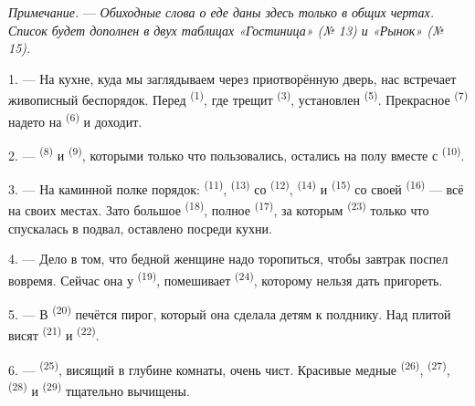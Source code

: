 \textit{Примечание.} --- \textit{Обиходные слова о еде даны здесь только
в общих чертах. Список будет дополнен в двух таблицах «Гостиница»
(№ 13) и «Рынок» (№ 15).}

\VUsaut{4.6mm}
\VUsaut{3.0mm}

1. --- На кухне, куда мы заглядываем через приотворённую дверь, нас
встречает живописный беспорядок. Перед  \textsuperscript{(1)}, где
трещит  \textsuperscript{(3)}, установлен 
\textsuperscript{(5)}. Прекрасное  \textsuperscript{(7)} надето на
 \textsuperscript{(6)} и доходит.

2. ---  \textsuperscript{(8)} и 
\textsuperscript{(9)}, которыми только что пользовались, остались на полу вместе
с  \textsuperscript{(10)}.

3. --- На каминной полке порядок:  \textsuperscript{(11)},
 \textsuperscript{(13)} со  \textsuperscript{(12)},
 \textsuperscript{(14)} и 
\textsuperscript{(15)} со своей  \textsuperscript{(16)} --- всё на своих
местах. Зато большое  \textsuperscript{(18)}, полное
 \textsuperscript{(17)}, за которым  \textsuperscript{(23)}
только что спускалась в подвал, оставлено посреди кухни.

4. --- Дело в том, что бедной женщине надо торопиться, чтобы завтрак
поспел вовремя. Сейчас она у  \textsuperscript{(19)}, помешивает
 \textsuperscript{(24)}, которому нельзя дать пригореть.

5. --- В  \textsuperscript{(20)} печётся пирог, который она
сделала детям к полднику. Над плитой висят 
\textsuperscript{(21)} и  \textsuperscript{(22)}.

\VUsaut{4.0mm}
\VUsaut{3.0mm}

6. ---  \textsuperscript{(25)}, висящий в глубине комнаты,
очень чист. Красивые медные  \textsuperscript{(26)},
 \textsuperscript{(27)},  \textsuperscript{(28)} и
 \textsuperscript{(29)} тщательно вычищены.

